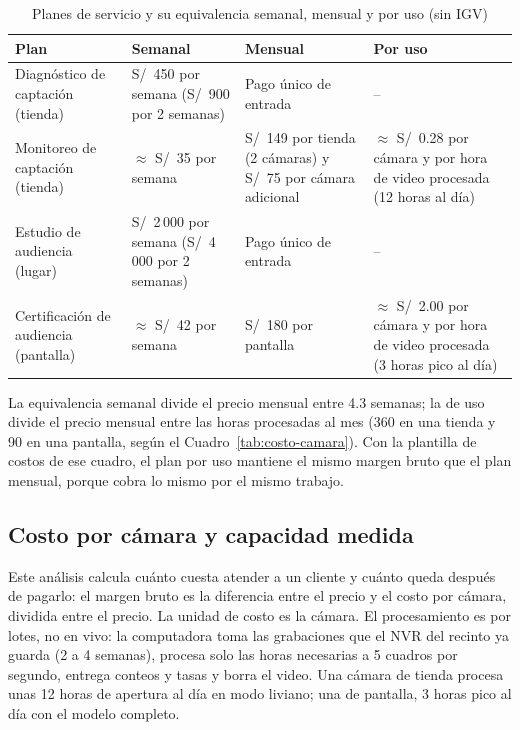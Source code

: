 \documentclass[12pt,a4paper]{article}
\begin{document}
\begin{table}[H]
\caption{Planes de servicio y su equivalencia semanal, mensual y por uso (sin IGV)}
\label{tab:planes}
\centering
\footnotesize
\renewcommand{\arraystretch}{1.12}
\begin{tabular}{|L{0.20\textwidth}|L{0.22\textwidth}|L{0.20\textwidth}|L{0.24\textwidth}|}
\hline
\textbf{Plan} & \textbf{Semanal} & \textbf{Mensual} & \textbf{Por uso} \\
\hline
Diagnóstico de captación (tienda) & S/~450 por semana (S/~900 por 2 semanas) & Pago único de entrada & -- \\
\hline
Monitoreo de captación (tienda) & $\approx$ S/~35 por semana & S/~149 por tienda (2 cámaras) y S/~75 por cámara adicional & $\approx$ S/~0.28 por cámara y por hora de video procesada (12 horas al día) \\
\hline
Estudio de audiencia (lugar) & S/~2\,000 por semana (S/~4\,000 por 2 semanas) & Pago único de entrada & -- \\
\hline
Certificación de audiencia (pantalla) & $\approx$ S/~42 por semana & S/~180 por pantalla & $\approx$ S/~2.00 por cámara y por hora de video procesada (3 horas pico al día) \\
\hline
\end{tabular}
\end{table}

La equivalencia semanal divide el precio mensual entre 4.3 semanas; la de uso
divide el precio mensual entre las horas procesadas al mes (360 en una tienda y
90 en una pantalla, según el Cuadro~\ref{tab:costo-camara}). Con la plantilla
de costos de ese cuadro, el plan por uso mantiene el mismo margen bruto que el
plan mensual, porque cobra lo mismo por el mismo trabajo.

\subsection{Costo por cámara y capacidad medida}

Este análisis calcula cuánto cuesta atender a un cliente y cuánto queda
después de pagarlo: el margen bruto es la diferencia entre el precio y el costo
por cámara, dividida entre el precio. La unidad de costo es la cámara. El
procesamiento es por lotes, no en vivo:
la computadora toma las grabaciones que el NVR del recinto ya guarda (2 a 4
semanas), procesa solo las horas necesarias a 5 cuadros por segundo, entrega
conteos y tasas y borra el video. Una cámara de tienda procesa unas 12 horas
de apertura al día en modo liviano; una de pantalla, 3 horas pico al día con
el modelo completo.
\end{document}
